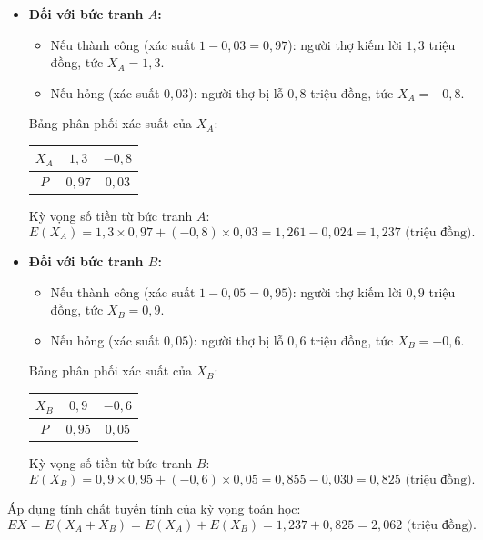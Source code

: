 \documentclass[12pt,a4paper]{article}
\theoremstyle{definition}
\begin{document}
\begin{itemize}
    \item \textbf{Đối với bức tranh $A$:}
    \begin{itemize}
        \item Nếu thành công (xác suất $1 - 0{,}03 = 0{,}97$): người thợ kiếm lời $1{,}3$ triệu đồng, tức $X_A = 1{,}3$.
        \item Nếu hỏng (xác suất $0{,}03$): người thợ bị lỗ $0{,}8$ triệu đồng, tức $X_A = -0{,}8$.
    \end{itemize}
    Bảng phân phối xác suất của $X_A$:
    \begin{center}
    \begin{tabular}{|c|c|c|}
    \hline
    $X_A$ & $1{,}3$ & $-0{,}8$ \\
    \hline
    $P$ & $0{,}97$ & $0{,}03$ \\
    \hline
    \end{tabular}
    \end{center}
    Kỳ vọng số tiền từ bức tranh $A$:
    \[
    E(X_A) = 1{,}3 \times 0{,}97 + (-0{,}8) \times 0{,}03 = 1{,}261 - 0{,}024 = 1{,}237 \text{ (triệu đồng)}.
    \]

    \item \textbf{Đối với bức tranh $B$:}
    \begin{itemize}
        \item Nếu thành công (xác suất $1 - 0{,}05 = 0{,}95$): người thợ kiếm lời $0{,}9$ triệu đồng, tức $X_B = 0{,}9$.
        \item Nếu hỏng (xác suất $0{,}05$): người thợ bị lỗ $0{,}6$ triệu đồng, tức $X_B = -0{,}6$.
    \end{itemize}
    Bảng phân phối xác suất của $X_B$:
    \begin{center}
    \begin{tabular}{|c|c|c|}
    \hline
    $X_B$ & $0{,}9$ & $-0{,}6$ \\
    \hline
    $P$ & $0{,}95$ & $0{,}05$ \\
    \hline
    \end{tabular}
    \end{center}
    Kỳ vọng số tiền từ bức tranh $B$:
    \[
    E(X_B) = 0{,}9 \times 0{,}95 + (-0{,}6) \times 0{,}05 = 0{,}855 - 0{,}030 = 0{,}825 \text{ (triệu đồng)}.
    \]
\end{itemize}

Áp dụng tính chất tuyến tính của kỳ vọng toán học:
\[
EX = E(X_A + X_B) = E(X_A) + E(X_B) = 1{,}237 + 0{,}825 = 2{,}062 \text{ (triệu đồng)}.
\]
\end{document}
